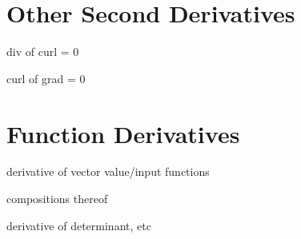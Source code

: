 \section{Other Second Derivatives}
\label{section:other_second_derivatives}

div of curl = 0

curl of grad = 0

\section{Function Derivatives}
\label{section:function_derivatives}

derivative of vector value/input functions

compositions thereof

derivative of determinant, etc